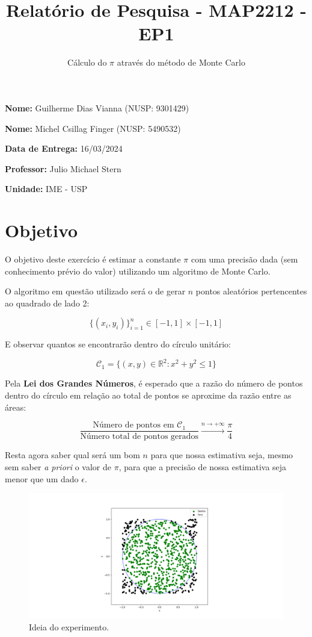 \documentclass[paper=a4wide, fontsize=10pt]{scrartcl}	 %
\title{\vspace{-1cm}  \color{emerald} Relatório de Pesquisa - MAP2212 - EP1}
\subtitle{Cálculo do \(\pi\) através do método de Monte Carlo %
\vspace{0.3cm} }
\date{} %
\begin{document}
\maketitle %
\thispagestyle{fancy} %


\vspace{-1.5cm} \textbf{Nome:} Guilherme Dias Vianna (NUSP: 9301429)

\textbf{Nome:} Michel Csillag Finger (NUSP: 5490532)

\textbf{Data de Entrega:} 16/03/2024

\textbf{Professor:} Julio Michael Stern

\textbf{Unidade:} IME - USP



\section{Objetivo}
    O objetivo deste exercício é estimar a constante \(\pi\) com uma precisão dada (sem conhecimento prévio do valor) utilizando um algoritmo de Monte Carlo.

    O algoritmo em questão utilizado será o de gerar \(n\) pontos aleatórios pertencentes ao quadrado de lado 2:

    \[
    \{(x_i,y_i)\}_{i=1}^n \in [-1,1]\times[-1,1]
    \]

    E observar quantos se encontrarão dentro do círculo unitário:

    \[
    \mathcal{C}_1 = \{(x,y)\in\mathbb{R}^2 : x^2+y^2\leqslant1\}
    \]

    Pela \textbf{Lei dos Grandes Números}\cite{Gut2005-GUTPAG}, é esperado que a razão do número de pontos dentro do círculo em relação ao total de pontos se aproxime da razão entre as áreas:

    \[\frac{\text{Número de pontos em \(\mathcal{C}_1\)}}{\text{Número total de pontos gerados}} \xrightarrow{n\rightarrow +\infty} \frac{\pi}{4}\]

   Resta agora saber qual será um bom \(n\) para que nossa estimativa seja, mesmo sem saber \textit{a priori} o valor de \(\pi\), para que a precisão de nossa estimativa seja menor que um dado \(\epsilon\).

    \begin{figure}[h!]
    \centering\includegraphics[width=1.1\linewidth]{Figure_1.png}
    \caption{Ideia do experimento.}
\end{figure}
   
\end{document}
